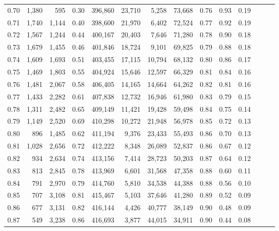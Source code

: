 \begin{tabular}{rrrrrrrrrrrrrr}
0.70 &   1,380 &    595 &  0.30 &  396,860 &   23,710 &   5,258 &  73,668 &  0.76 &  0.93 &      0.19 \\
0.71 &   1,740 &  1,144 &  0.40 &  398,600 &   21,970 &   6,402 &  72,524 &  0.77 &  0.92 &      0.19 \\
0.72 &   1,567 &  1,244 &  0.44 &  400,167 &   20,403 &   7,646 &  71,280 &  0.78 &  0.90 &      0.18 \\
0.73 &   1,679 &  1,455 &  0.46 &  401,846 &   18,724 &   9,101 &  69,825 &  0.79 &  0.88 &      0.18 \\
0.74 &   1,609 &  1,693 &  0.51 &  403,455 &   17,115 &  10,794 &  68,132 &  0.80 &  0.86 &      0.17 \\
0.75 &   1,469 &  1,803 &  0.55 &  404,924 &   15,646 &  12,597 &  66,329 &  0.81 &  0.84 &      0.16 \\
0.76 &   1,481 &  2,067 &  0.58 &  406,405 &   14,165 &  14,664 &  64,262 &  0.82 &  0.81 &      0.16 \\
0.77 &   1,433 &  2,282 &  0.61 &  407,838 &   12,732 &  16,946 &  61,980 &  0.83 &  0.79 &      0.15 \\
0.78 &   1,311 &  2,482 &  0.65 &  409,149 &   11,421 &  19,428 &  59,498 &  0.84 &  0.75 &      0.14 \\
0.79 &   1,149 &  2,520 &  0.69 &  410,298 &   10,272 &  21,948 &  56,978 &  0.85 &  0.72 &      0.13 \\
0.80 &     896 &  1,485 &  0.62 &  411,194 &    9,376 &  23,433 &  55,493 &  0.86 &  0.70 &      0.13 \\
0.81 &   1,028 &  2,656 &  0.72 &  412,222 &    8,348 &  26,089 &  52,837 &  0.86 &  0.67 &      0.12 \\
0.82 &     934 &  2,634 &  0.74 &  413,156 &    7,414 &  28,723 &  50,203 &  0.87 &  0.64 &      0.12 \\
0.83 &     813 &  2,845 &  0.78 &  413,969 &    6,601 &  31,568 &  47,358 &  0.88 &  0.60 &      0.11 \\
0.84 &     791 &  2,970 &  0.79 &  414,760 &    5,810 &  34,538 &  44,388 &  0.88 &  0.56 &      0.10 \\
0.85 &     707 &  3,108 &  0.81 &  415,467 &    5,103 &  37,646 &  41,280 &  0.89 &  0.52 &      0.09 \\
0.86 &     677 &  3,131 &  0.82 &  416,144 &    4,426 &  40,777 &  38,149 &  0.90 &  0.48 &      0.09 \\
0.87 &     549 &  3,238 &  0.86 &  416,693 &    3,877 &  44,015 &  34,911 &  0.90 &  0.44 &      0.08 \\

\end{tabular}
